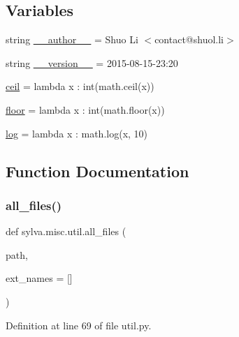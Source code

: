 \subsection*{Variables}
\begin{DoxyCompactItemize}
\item 
string \hyperlink{namespacesylva_1_1misc_1_1util_a1111366860ec15b68260a43ac632d257}{\+\_\+\+\_\+author\+\_\+\+\_\+} = \textquotesingle{}Shuo Li $<$contact@shuol.\+li$>$\textquotesingle{}
\item 
string \hyperlink{namespacesylva_1_1misc_1_1util_aa458ed92c21a116abe2d5f9ab81a2125}{\+\_\+\+\_\+version\+\_\+\+\_\+} = \textquotesingle{}2015-\/08-\/15-\/23\+:20\textquotesingle{}
\item 
\hyperlink{namespacesylva_1_1misc_1_1util_ae24a7e9d1f4709e04a181e488d3e7e96}{ceil} = lambda x \+: int(math.\+ceil(x))
\item 
\hyperlink{namespacesylva_1_1misc_1_1util_aa02f5d131cb4bc9ad1c277a7b0c76885}{floor} = lambda x \+: int(math.\+floor(x))
\item 
\hyperlink{namespacesylva_1_1misc_1_1util_ab3731c524403f8c49cdb518af558d408}{log} = lambda x \+: math.\+log(x, 10)
\end{DoxyCompactItemize}


\subsection{Function Documentation}
\mbox{\label{namespacesylva_1_1misc_1_1util_a5dfe1979a130725652883d277a24ee5d}} 
\subsubsection{\texorpdfstring{all\+\_\+files()}{all\_files()}}
{\footnotesize\ttfamily def sylva.\+misc.\+util.\+all\+\_\+files (\begin{DoxyParamCaption}\item[{}]{path,  }\item[{}]{ext\+\_\+names = {\ttfamily \mbox{[}\mbox{]}} }\end{DoxyParamCaption})}



Definition at line 69 of file util.\+py.



